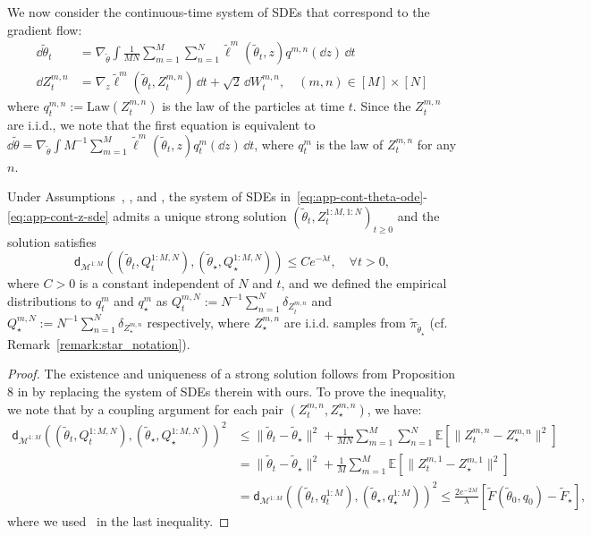 We now consider the continuous-time system of SDEs that correspond to the gradient flow:
\begin{align}
    \dd \tilde{\theta}_t &= \nabla_{\tilde\theta} \int\frac{1}{M N} \sum_{m=1}^M \sum_{n=1}^N \tilde{\ell}^m(\tilde\theta_t, z) q^{m,n}(\dd z) \, \dd t\label{eq:app-cont-theta-ode} \\
    \dd Z_t^{m,n} &= \nabla_{z} \tilde{\ell}^m(\tilde\theta_t, Z_t^{m,n}) \, \dd t + \sqrt{2} \, \dd W_t^{m,n}, \quad (m,n)\in[M]\times [N]\label{eq:app-cont-z-sde}
\end{align}
where $q_t^{m,n}:=\mathrm{Law}(Z_t^{m,n})$ is the law of the particles at time $t$. Since the $Z_t^{m,n}$ are i.i.d., we note that the first equation is equivalent to $\dd \tilde\theta = \nabla_{\tilde\theta} \int {M}^{-1}\sum_{m=1}^M \tilde{\ell}^m(\tilde\theta_t, z) q_t^m(\dd z) \, \dd t$, where $q_t^m$ is the law of $Z_t^{m,n}$ for any $n$.
\begin{lemma}\label{lem:cont-time-convg}
    Under Assumptions~, , and , the system of SDEs in~\eqref{eq:app-cont-theta-ode}-\eqref{eq:app-cont-z-sde} admits a unique strong solution $(\tilde\theta_t, Z_t^{1:M,1:N})_{t \geq 0}$ and the solution satisfies
    \begin{equation*}
        \mathsf{d}_{\mathcal{M}^{1:M}}((\tilde\theta_t, Q_t^{1:M,N}), (\tilde\theta_\star, Q_\star^{1:M,N})) \leq C e^{-\lambda t}, \quad \forall t>0,
    \end{equation*}
    where $C>0$ is a constant independent of $N$ and $t$, and we defined the empirical distributions to $q_t^m$ and $q_\star^m$ as $Q_t^{m,N}:=N^{-1}\sum_{n=1}^N \delta_{Z_t^{m,n}}$ and $Q_\star^{m,N}:=N^{-1}\sum_{n=1}^N \delta_{Z_\star^{m,n}}$ respectively, where $Z_\star^{m,n}$ are i.i.d. samples from $\tilde\pi_{\tilde\theta_\star}$ (cf. Remark~\ref{remark:star_notation}).
\end{lemma}
\begin{proof}
    The existence and uniqueness of a strong solution follows from Proposition 8 in  \citet{caprioerrorboundsparticle2024} by replacing the system of SDEs therein with ours. To prove the inequality, we note that by a coupling argument for each pair $(Z_t^{m,n}, Z_\star^{m,n})$, we have:
    \begin{align*}
        \mathsf{d}_{\mathcal{M}^{1:M}}((\tilde\theta_t, Q_t^{1:M,N}), (\tilde\theta_\star, Q_\star^{1:M,N}))^2 &\leq \|\tilde\theta_t-\tilde\theta_\star\|^2 + \frac{1}{MN} \sum_{m=1}^{M}\sum_{n=1}^{N} \mathbb{E}[\|Z_t^{m,n}-Z_\star^{m,n}\|^2] \\
        &=\|\tilde\theta_t-\tilde\theta_\star\|^2 + \frac1M \sum_{m=1}^{M}\mathbb{E}[\|Z_t^{m,1}-Z_\star^{m,1}\|^2] \\
        &= \mathsf{d}_{\mathcal{M}^{1:M}}((\tilde\theta_t, q_t^{1:M}), (\tilde\theta_\star, q_\star^{1:M}))^2 \leq \frac{2e^{-2\lambda t}}{\lambda} [\tilde{F}(\tilde\theta_0, q_0) - \tilde{F}_\star],
    \end{align*}
    where we used~ in the last inequality.
\end{proof}



